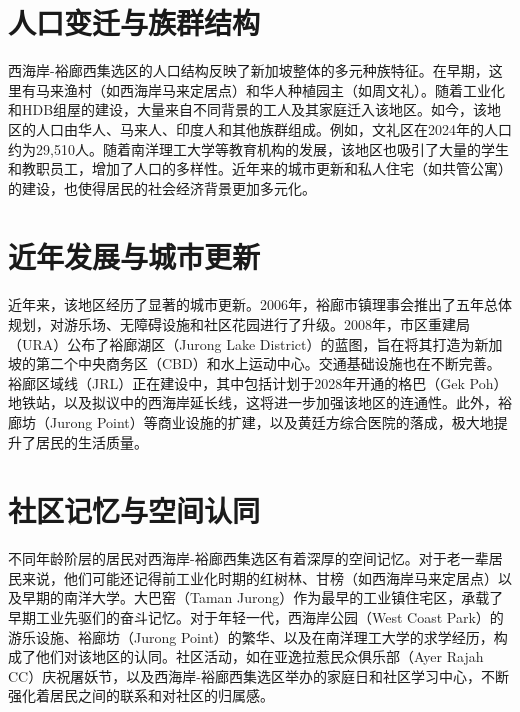 \documentclass[11pt,a4paper,twoside,openany]{book}
\begin{document}
\section{人口变迁与族群结构}
西海岸-裕廊西集选区的人口结构反映了新加坡整体的多元种族特征。在早期，这里有马来渔村（如西海岸马来定居点）和华人种植园主（如周文礼）。随着工业化和HDB组屋的建设，大量来自不同背景的工人及其家庭迁入该地区。如今，该地区的人口由华人、马来人、印度人和其他族群组成。例如，文礼区在2024年的人口约为29,510人。随着南洋理工大学等教育机构的发展，该地区也吸引了大量的学生和教职员工，增加了人口的多样性。近年来的城市更新和私人住宅（如共管公寓）的建设，也使得居民的社会经济背景更加多元化。

\section{近年发展与城市更新}
近年来，该地区经历了显著的城市更新。2006年，裕廊市镇理事会推出了五年总体规划，对游乐场、无障碍设施和社区花园进行了升级。2008年，市区重建局（URA）公布了裕廊湖区（Jurong Lake District）的蓝图，旨在将其打造为新加坡的第二个中央商务区（CBD）和水上运动中心。交通基础设施也在不断完善。裕廊区域线（JRL）正在建设中，其中包括计划于2028年开通的格巴（Gek Poh）地铁站，以及拟议中的西海岸延长线，这将进一步加强该地区的连通性。此外，裕廊坊（Jurong Point）等商业设施的扩建，以及黄廷方综合医院的落成，极大地提升了居民的生活质量。

\section{社区记忆与空间认同}
不同年龄阶层的居民对西海岸-裕廊西集选区有着深厚的空间记忆。对于老一辈居民来说，他们可能还记得前工业化时期的红树林、甘榜（如西海岸马来定居点）以及早期的南洋大学。大巴窑（Taman Jurong）作为最早的工业镇住宅区，承载了早期工业先驱们的奋斗记忆。对于年轻一代，西海岸公园（West Coast Park）的游乐设施、裕廊坊（Jurong Point）的繁华、以及在南洋理工大学的求学经历，构成了他们对该地区的认同。社区活动，如在亚逸拉惹民众俱乐部（Ayer Rajah CC）庆祝屠妖节，以及西海岸-裕廊西集选区举办的家庭日和社区学习中心，不断强化着居民之间的联系和对社区的归属感。
\end{document}
